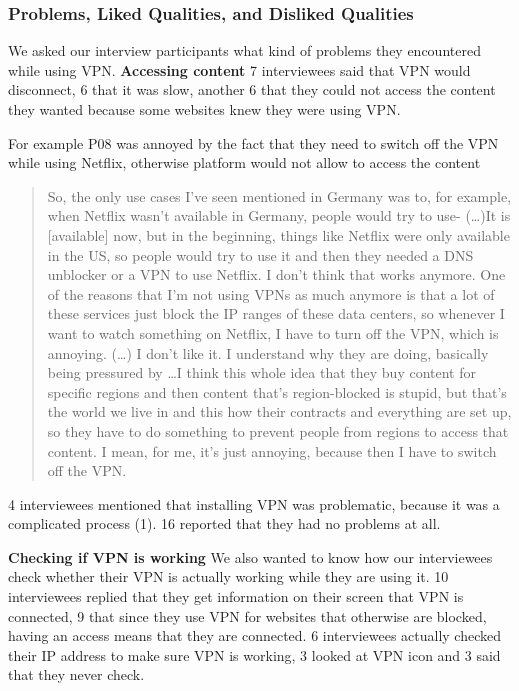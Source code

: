 \subsubsection{Problems, Liked Qualities, and Disliked Qualities} We asked our
interview participants what kind of problems they encountered while using VPN.
\textbf{Accessing content} 7 interviewees said that VPN would disconnect, 6
that it was slow, another 6 that they could not access the content they wanted
because some websites knew they were using VPN. 


For example P08 was annoyed by the fact that they need to switch off the VPN
while using Netflix, otherwise platform would not allow to access the content

\begin{quote}So, the only use cases I've seen mentioned in Germany was to, for
example, when Netflix wasn't available in Germany, people would try to use-
(\dots)It is [available] now, but in the beginning, things like Netflix were
only available in the US, so people would try to use it and then they needed a
DNS unblocker or a VPN to use Netflix. I don't think that works anymore. One
of the reasons that I'm not using VPNs as much anymore is that a lot of these
services just block the IP ranges of these data centers, so whenever I want to
watch something on Netflix, I have to turn off the VPN, which is annoying.
(\dots) I don't like it. I understand why they are doing, basically being
pressured by \dots I think this whole idea that they buy content for specific
regions and then content that's region-blocked is stupid, but that's the world
we live in and this how their contracts and everything are set up, so they
have to do something to prevent people from regions to access that content. I
mean, for me, it's just annoying, because then I have to switch off the VPN.
\end{quote}


4 interviewees mentioned that installing VPN was problematic, because it was a
complicated process (1). 16 reported that they had no problems at all. 

\textbf{Checking if VPN is working} We also wanted to know how our
interviewees check whether their VPN is actually working while they are using
it. 10 interviewees replied that they get information on their screen that VPN
is connected, 9 that since they use VPN for websites that otherwise are
blocked, having an access means that they are connected. 6 interviewees
actually checked their IP address to make sure VPN is working, 3 looked at VPN
icon and 3 said that they never check. 

